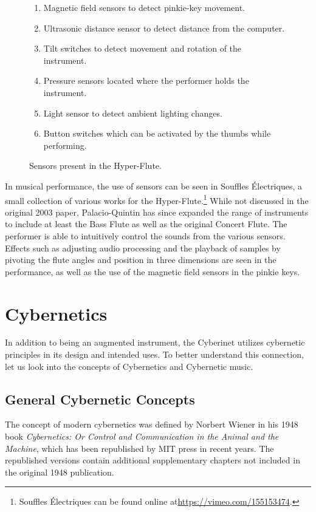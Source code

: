 \begin{figure}
    \centering
    \begin{enumerate}
        \item Magnetic field sensors to detect pinkie-key movement.
        \item Ultrasonic distance sensor to detect distance from the computer.
        \item Tilt switches to detect movement and rotation of the instrument.
        \item Pressure sensors located where the performer holds the instrument.
        \item Light sensor to detect ambient lighting changes.
        \item Button switches which can be activated by the thumbs while performing.
    \end{enumerate}
    \caption{Sensors present in the Hyper-Flute.}
    \label{fig:hyper-flute-sensors}
\end{figure}

In musical performance, the use of sensors can be seen in Souffles Électriques, a small collection of various works for the Hyper-Flute.\footnote{Souffles Électriques can be found online at\url{https://vimeo.com/155153474}.} While not discussed in the original 2003 paper, Palacio-Quintin has since expanded the range of instruments to include at least the Bass Flute as well as the original Concert Flute. The performer is able to intuitively control the sounds from the various sensors. Effects such as adjusting audio processing and the playback of samples by pivoting the flute angles and position in three dimensions are seen in the performance, as well as the use of the magnetic field sensors in the pinkie keys.


\section{Cybernetics}
In addition to being an augmented instrument, the Cyberinet utilizes cybernetic principles in its design and intended uses. To better understand this connection, let us look into the concepts of Cybernetics and Cybernetic music.

\subsection{General Cybernetic Concepts}
The concept of modern cybernetics was defined by Norbert Wiener in his 1948 book \textit{Cybernetics: Or Control and Communication in the Animal and the Machine}, which has been republished by MIT press in recent years\cite{WeinerCybernetics2019}. The republished versions contain additional supplementary chapters not included in the original 1948 publication.

